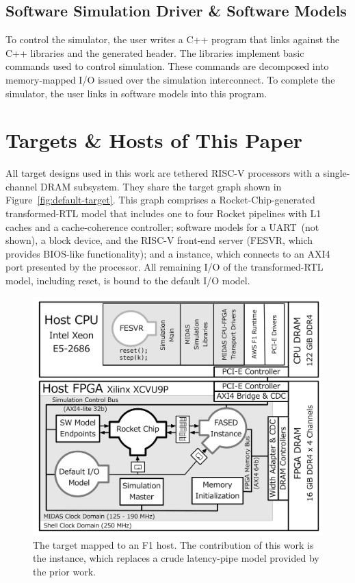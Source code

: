 \subsection{Software Simulation Driver \& Software Models}
To control the simulator, the user writes a C++ program that links against the
\SIMNAME C++ libraries and the generated header. The \SIMNAME libraries implement
basic commands used to control simulation.  These commands are decomposed into
memory-mapped I/O issued over the simulation interconnect.  To complete
the simulator, the user links in software models into this program.

\section{Targets \& Hosts of This Paper}\label{sec:targetandhostmachines}

All target designs used in this work are tethered RISC-V processors with a
single-channel DRAM subsystem.  They share the target graph shown in
Figure~\ref{fig:default-target}. This graph comprises a Rocket-Chip-generated
transformed-RTL model that includes one to four Rocket pipelines with L1 caches
and a cache-coherence controller; software models for a UART~(not shown),
a block device, and the RISC-V front-end server
(FESVR, which provides BIOS-like functionality); and a \PNAME instance,
which connects to an AXI4 port presented by the processor.  All remaining I/O
of the transformed-RTL model, including reset, is bound to the default I/O
model.

\begin{figure}[t]
\vspace{-0.1in}
    \centering
    \includegraphics[width=\columnwidth]{figures/mapped-simulator.pdf}
    \vspace{-0.25in}
    \caption{The target mapped to an F1 host. The contribution of this work is
    the \PNAME instance, which replaces a crude latency-pipe model provided
    by the prior work.}
    \label{fig:mapped-simulator}
\vspace{-0.10in}
\end{figure}

